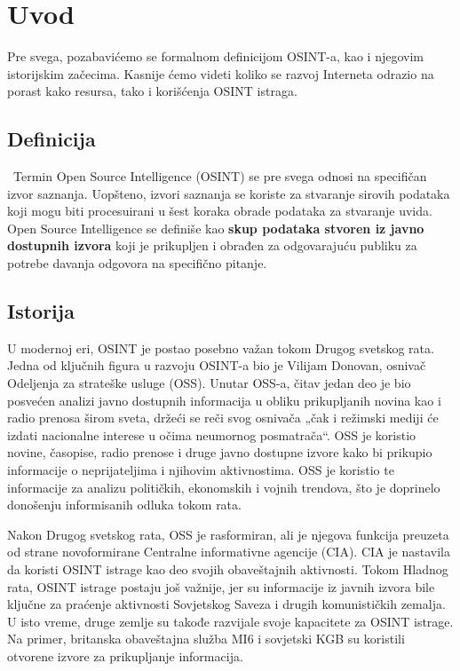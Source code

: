 \documentclass[fleqn, 12pt]{article}
\begin{document}

\setcounter{tocdepth}{2}
\tableofcontents
\newpage
\section{Uvod}
Pre svega, pozabavićemo se formalnom definicijom OSINT-a, kao i njegovim istorijskim začecima. Kasnije ćemo videti koliko se razvoj Interneta odrazio na porast kako resursa, tako i korišćenja OSINT istraga. 

\subsection{Definicija}\
Termin Open Source Intelligence (OSINT) se pre svega odnosi na specifičan izvor saznanja. Uopšteno, izvori saznanja se koriste za stvaranje sirovih podataka koji mogu biti procesuirani u šest koraka obrade podataka za stvaranje uvida. Open Source Intelligence se definiše kao \textbf{skup podataka stvoren iz javno dostupnih izvora} koji je prikupljen i obrađen za odgovarajuću publiku za potrebe davanja odgovora na specifično pitanje.

\subsection{Istorija}
U modernoj eri, OSINT je postao posebno važan tokom Drugog svetskog rata. Jedna od ključnih figura u razvoju OSINT-a bio je Vilijam Donovan, osnivač Odeljenja za strateške usluge (OSS). Unutar OSS-a, čitav jedan deo je bio posvećen analizi javno dostupnih informacija u obliku prikupljanih novina kao i radio prenosa širom sveta, držeći se reči svog osnivača „čak i režimski mediji će izdati nacionalne interese u očima neumornog posmatrača“. OSS je koristio novine, časopise, radio prenose i druge javno dostupne izvore kako bi prikupio informacije o neprijateljima i njihovim aktivnostima. OSS je koristio te informacije za analizu političkih, ekonomskih i vojnih trendova, što je doprinelo donošenju informisanih odluka tokom rata. \newline


Nakon Drugog svetskog rata, OSS je rasformiran, ali je njegova funkcija preuzeta od strane novoformirane Centralne informativne agencije (CIA). CIA je nastavila da koristi OSINT istrage kao deo svojih obaveštajnih aktivnosti. Tokom Hladnog rata, OSINT istrage postaju još važnije, jer su informacije iz javnih izvora bile ključne za praćenje aktivnosti Sovjetskog Saveza i drugih komunističkih zemalja. U isto vreme, druge zemlje su takođe razvijale svoje kapacitete za OSINT istrage. Na primer, britanska obaveštajna služba MI6 i sovjetski KGB su koristili otvorene izvore za prikupljanje informacija.
\newpage
\end{document}

